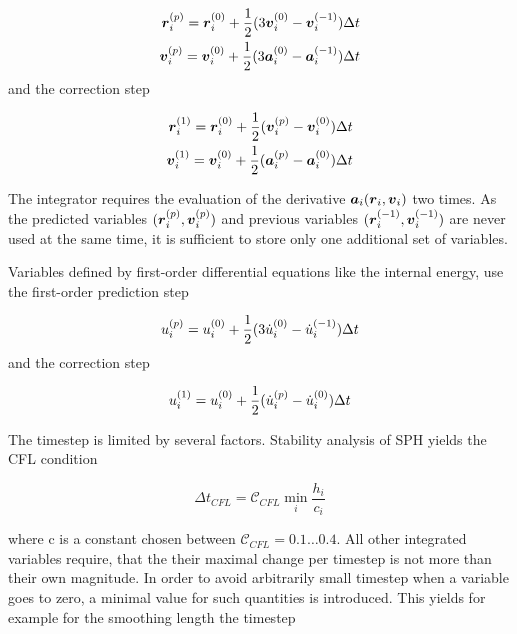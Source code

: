 \begin{eqnarray}
\label{ch02_sph02_eq019}
\boldsymbol{r}_i^{(p)} = \boldsymbol{r}_i^{(0)} + \frac{1}{2} ( 3 \boldsymbol{v}_i^{(0)} - \boldsymbol{v}_i^{(-1)} )\Delta t \\
\boldsymbol{v}_i^{(p)} = \boldsymbol{v}_i^{(0)} + \frac{1}{2} ( 3 \boldsymbol{a}_i^{(0)} - \boldsymbol{a}_i^{(-1)} )\Delta t
\end{eqnarray}
and the correction step

\begin{eqnarray}
\label{ch02_sph02_eq020}
\boldsymbol{r}_i^{(1)} = \boldsymbol{r}_i^{(0)} + \frac{1}{2} ( \boldsymbol{v}_i^{(p)} - \boldsymbol{v}_i^{(0)} )\Delta t \\
\boldsymbol{v}_i^{(1)} = \boldsymbol{v}_i^{(0)} + \frac{1}{2} ( \boldsymbol{a}_i^{(p)} - \boldsymbol{a}_i^{(0)} )\Delta t
\end{eqnarray}

The integrator requires the evaluation of the derivative $\boldsymbol{a}_i( \boldsymbol{r}_i, \boldsymbol{v}_i)$ two times. As the predicted variables $(\boldsymbol{r}_i^{(p)}, \boldsymbol{v}_i^{(p)})$ and previous variables $(\boldsymbol{r}_i^{(-1)}, \boldsymbol{v}_i^{(-1)})$ are never used at the same time, it is sufficient to store only one additional set of variables.

Variables defined by first-order differential equations like the internal energy, use the first-order prediction step

\begin{equation}
\label{ch02_sph02_eq021}
u_i^{(p)} = u_i^{(0)} + \frac{1}{2} ( 3 \dot{u}_i^{(0)} - \dot{u}_i^{(-1)} )\Delta t \\
\end{equation}
and the correction step

\begin{equation}
\label{ch02_sph02_eq022}
u_i^{(1)} = u_i^{(0)} + \frac{1}{2} ( \dot{u}_i^{(p)} - \dot{u}_i^{(0)} )\Delta t \\
\end{equation}

The timestep is limited by several factors. Stability analysis of SPH yields the CFL condition 

\begin{equation}
\label{ch02_sph02_eq023}
\Delta t_{CFL} = \mathcal{C}_{CFL} \min_{i} \frac{h_i}{c_i}
\end{equation}

where c is a constant chosen between $\mathcal{C}_{CFL} = 0.1 \dots 0.4$. All other integrated variables require, that the their maximal change per timestep is not more than their own magnitude. In order to avoid arbitrarily small timestep when a variable goes to zero, a minimal value for such quantities is introduced. This yields for example for the smoothing length the timestep

